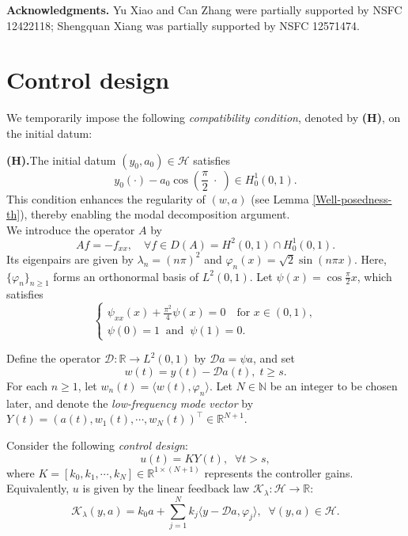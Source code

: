 \documentclass[a4paper]{article}
\numberwithin{equation}{section}
\begin{document}
 \noindent \textbf{Acknowledgments.} Yu Xiao and Can Zhang were partially supported by NSFC 12422118; Shengquan Xiang was partially supported by NSFC 12571474.

\section{Control design}\label{control}
 We temporarily impose the following \textit{compatibility condition}, denoted by \textbf{(H)}, on the initial datum:

 \noindent\textbf{(H).}\;\;\;The initial datum $(y_0,a_0)\in\mathcal{H}$ satisfies
\begin{equation}\label{cop-con}
    y_0(\cdot)-a_0\cos(\frac{\pi}{2}\;\cdot\;)\in H^1_0(0,1).
\end{equation}    
\noindent This condition enhances the regularity of $(w,a)$ (see Lemma \ref{Well-posedness-th}), thereby enabling the modal decomposition argument.\\[-2mm]

We introduce the operator $A$ by
\begin{equation}\label{Dirichlet-Laplace}
     Af= -f_{xx}, \quad \forall f\in D(A)=H^2(0,1)\cap H^1_0(0,1).
\end{equation}
Its eigenpairs are given by $\lambda_n=(n\pi)^2$ and $\varphi_n(x)=\sqrt{2}\sin(n\pi x)$. Here, $\{\varphi_n\}_{n\ge 1}$ forms an orthonormal basis of $L^2(0,1)$. Let $\psi(x)=\cos\frac{\pi}{2}x$, which satisfies 
\begin{equation*}
   \left\{\begin{array}{ll}
        \psi_{xx}(x)+ \frac{\pi^2}{4}\psi(x)=0\quad \text{for }x\in (0,1),\\
        \psi(0)=1\;\;\text{and}\;\;\psi(1)=0.
    \end{array}\right.
\end{equation*}

Define the operator $\mathcal{D}:\mathbb{R}\to L^2(0,1)$ by $\mathcal{D}a=\psi a$, and set
$$w(t)=y(t)-\mathcal{D} a(t),\;t\ge s.$$ For each $n\ge 1$, let $w_n(t)=\langle w(t),\varphi_n\rangle$. Let $N\in \mathbb{N}$ be an integer to be chosen later, and denote the \textit{low-frequency mode vector} by $ Y(t)=
(a(t),w_1(t) ,\cdots ,w_N(t))^\top\in \mathbb{R}^{N+1}$. 

Consider the following \textit{control design}:
\begin{equation}
    \label{con-heat}
       u(t)=KY(t),\;\;\forall t>s,
\end{equation}
where $K=[k_0,k_1,\cdots,k_N]\in \mathbb{R}^{1\times {(N+1)}}$ represents the controller gains. Equivalently, $u$ is given by the linear feedback law $\mathcal{K}_{\lambda}:\mathcal{H}\to \mathbb{R}$:
\begin{equation}\label{lin-feed}
    \mathcal{K}_{\lambda}(y,a)=k_0a+\sum_{j=1}^Nk_j\langle y-\mathcal{D}a,\varphi_j\rangle,\;\;\forall  (y,a)\in\mathcal{H}.
\end{equation}
\end{document}
